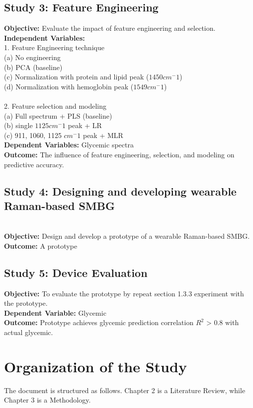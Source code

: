 \subsection{Study 3: Feature Engineering}
\textbf{Objective:} Evaluate the impact of feature engineering and selection.
\\
\textbf{Independent Variables:} 
\\1. Feature Engineering technique
\\(a) No engineering
\\(b) PCA (baseline)
\\(c) Normalization with protein and lipid peak ($1450 cm^-1$)
\\(d) Normalization with hemoglobin peak ($1549 cm^-1$)
\\
\\2. Feature selection and modeling
\\(a) Full spectrum + PLS (baseline)
\\(b) single $1125 cm^-1$ peak + LR
\\(c) 911, 1060, 1125 $cm^-1$ peak + MLR
\\
\textbf{Dependent Variables:} Glycemic spectra
\\
\textbf{Outcome:} The influence of feature engineering, selection, and modeling on predictive accuracy.
\\
\subsection{Study 4: Designing and developing wearable Raman-based SMBG}
\\
\textbf{Objective:} Design and develop a prototype of a wearable Raman-based SMBG.
\\
\textbf{Outcome:} A prototype
\\
\subsection{Study 5: Device Evaluation}
\textbf{Objective:} To evaluate the prototype by repeat section 1.3.3 experiment with the prototype.
\\
\textbf{Dependent Variable:} Glycemic
\\
\textbf{Outcome:} Prototype achieves glycemic prediction correlation $R^2$ > 0.8 with actual glycemic.


\section{Organization of the Study}
The document is structured as follows. Chapter 2 is a Literature Review, while Chapter 3 is a Methodology.